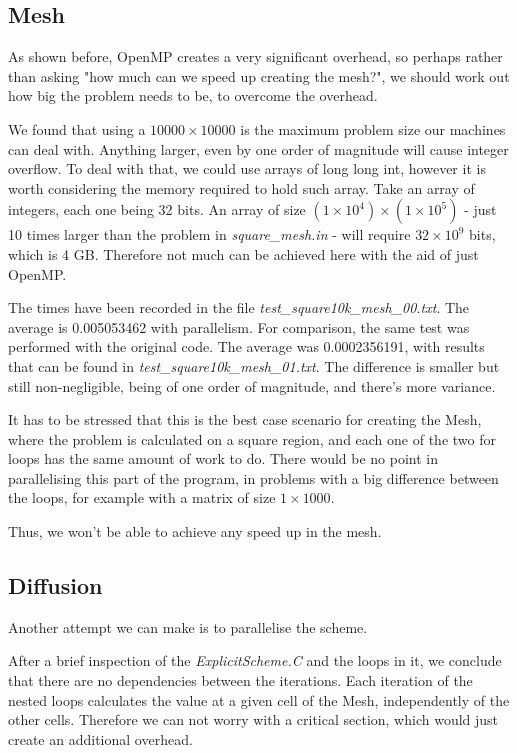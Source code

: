 \documentclass[11pt,journal]{IEEEtran}
\begin{document}
	\subsection{Mesh}
	As shown before, OpenMP creates a very significant overhead, so perhaps rather than asking "how much can we speed up creating the mesh?", we should work out how big the problem needs to be, to overcome the overhead.
	
	We found that using a $10000 \times 10000$ is the maximum problem size our machines can deal with. Anything larger, even by one order of magnitude will cause integer overflow. To deal with that, we could use arrays of long long int, however it is worth considering the memory required to hold such array. Take an array of integers, each one being 32 bits. An array of size $(1 \times 10^4) \times (1 \times 10^5)$ - just 10 times larger than the problem in \emph{square\_mesh.in} - will require $32 \times 10^{9}$ bits, which is 4 GB. Therefore not much can be achieved here with the aid of just OpenMP. 
	
	The times have been recorded in the file \emph{test\_square10k\_mesh\_00.txt}. The average is 0.005053462 with parallelism. For comparison, the same test was performed with the original code. The average was 0.0002356191, with results that can be found in \emph{test\_square10k\_mesh\_01.txt}. The difference is smaller but still non-negligible, being of one order of magnitude, and there's more variance.
	
	It has to be stressed that this is the best case scenario for creating the Mesh, where the problem is calculated on a square region, and each one of the two for loops has the same amount of work to do. There would be no point in parallelising this part of the program, in problems with a big difference between the loops, for example with a matrix of size $1 \times 1000$.
	
	Thus, we won't be able to achieve any speed up in the mesh. 
	
	\subsection{Diffusion}
	
	
	
	Another attempt we can make is to parallelise the scheme.
	
	After a brief inspection of the \emph{ExplicitScheme.C} and the loops in it, we conclude that there are no dependencies between the iterations. Each iteration of the nested loops calculates the value at a given cell of the Mesh, independently of the other cells. Therefore we can not worry with a critical section, which would just create an additional overhead. 
	
\end{document}
